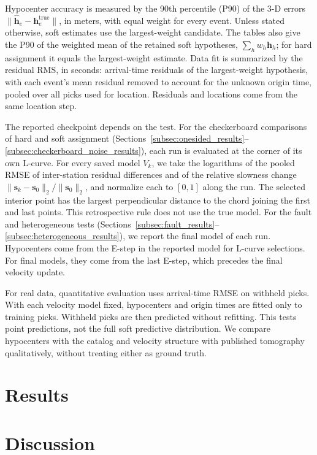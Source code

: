 \documentclass[12pt, a4paper]{article}
\begin{document}
Hypocenter accuracy is measured by the 90th percentile (P90) of the 3-D errors $\|\widehat{\mathbf h}_e-\mathbf h_e^{\mathrm{true}}\|$, in meters, with equal weight for every event. Unless stated otherwise, soft estimates use the largest-weight candidate. The tables also give the P90 of the weighted mean of the retained soft hypotheses, $\sum_h w_h\mathbf h_h$; for hard assignment it equals the largest-weight estimate. Data fit is summarized by the residual RMS, in seconds: arrival-time residuals of the largest-weight hypothesis, with each event's mean residual removed to account for the unknown origin time, pooled over all picks used for location. Residuals and locations come from the same location step.

The reported checkpoint depends on the test. For the checkerboard comparisons of hard and soft assignment (Sections~\ref{subsec:onesided_results}--\ref{subsec:checkerboard_noise_results}), each run is evaluated at the corner of its own L-curve. For every saved model $V_k$, we take the logarithms of the pooled RMSE of inter-station residual differences and of the relative slowness change $\|\mathbf s_k-\mathbf s_0\|_2/\|\mathbf s_0\|_2$, and normalize each to $[0,1]$ along the run. The selected interior point has the largest perpendicular distance to the chord joining the first and last points. This retrospective rule does not use the true model. For the fault and heterogeneous tests (Sections~\ref{subsec:fault_results}--\ref{subsec:heterogeneous_results}), we report the final model of each run. Hypocenters come from the E-step in the reported model for L-curve selections. For final models, they come from the last E-step, which precedes the final velocity update.

For real data, quantitative evaluation uses arrival-time RMSE on withheld picks. With each velocity model fixed, hypocenters and origin times are fitted only to training picks. Withheld picks are then predicted without refitting. This tests point predictions, not the full soft predictive distribution. We compare hypocenters with the catalog and velocity structure with published tomography qualitatively, without treating either as ground truth.

\section{Results}
\label{sec:results}


\section{Discussion}
\label{sec:discussion}
\end{document}
